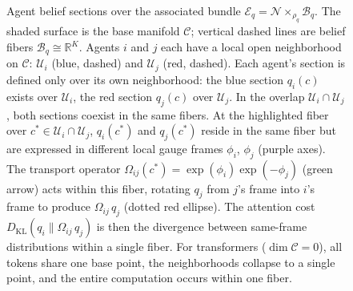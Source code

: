 \documentclass[twoside,11pt]{article}
\newcommand{\KL}{\operatorname{KL}}
\begin{document}
\begin{figure}[t]
\caption{%
Agent belief sections over the associated bundle
$\mathcal{E}_q = \mathcal{N} \times_{\rho_q} \mathcal{B}_q$.
The shaded surface is the base manifold $\mathcal{C}$;
vertical dashed lines are belief fibers $\mathcal{B}_q \cong \mathbb{R}^K$.
Agents $i$ and $j$ each have a local open neighborhood on $\mathcal{C}$:
$\mathcal{U}_i$ (blue, dashed) and $\mathcal{U}_j$ (red, dashed).
Each agent's section is defined only over its own neighborhood:
the blue section $q_i(c)$ exists over $\mathcal{U}_i$,
the red section $q_j(c)$ over $\mathcal{U}_j$.
In the overlap $\mathcal{U}_i \cap \mathcal{U}_j$,
both sections coexist in the same fibers.
At the highlighted fiber over $c^* \in \mathcal{U}_i \cap \mathcal{U}_j$,
$q_i(c^*)$ and $q_j(c^*)$ reside in the same fiber
but are expressed in different local gauge frames
$\phi_i$, $\phi_j$ (purple axes).
The transport operator
$\Omega_{ij}(c^*) = \exp(\phi_i)\exp(-\phi_j)$
(green arrow) acts within this fiber,
rotating $q_j$ from $j$'s frame into $i$'s frame
to produce $\Omega_{ij}\,q_j$ (dotted red ellipse).
The attention cost $D_{\mathrm{KL}}(q_i \| \Omega_{ij}\,q_j)$
is then the divergence between same-frame distributions within a single fiber.
For transformers ($\dim\mathcal{C} = 0$),
all tokens share one base point, the neighborhoods collapse to a single point,
and the entire computation occurs within one fiber.
}
\label{fig:bundle_sections_surface}
\end{figure}
\end{document}
